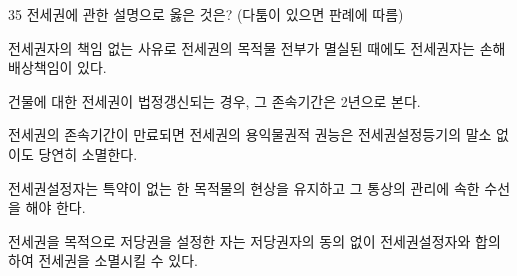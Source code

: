 \begin{question}{35}
전세권에 관한 설명으로 옳은 것은? (다툼이 있으면 판례에 따름)
\begin{choices}
  \item 전세권자의 책임 없는 사유로 전세권의 목적물 전부가 멸실된 때에도 전세권자는 손해배상책임이 있다.
  \item 건물에 대한 전세권이 법정갱신되는 경우, 그 존속기간은 2년으로 본다.
  \item 전세권의 존속기간이 만료되면 전세권의 용익물권적 권능은 전세권설정등기의 말소 없이도 당연히 소멸한다.
  \item 전세권설정자는 특약이 없는 한 목적물의 현상을 유지하고 그 통상의 관리에 속한 수선을 해야 한다.
  \item 전세권을 목적으로 저당권을 설정한 자는 저당권자의 동의 없이 전세권설정자와 합의하여 전세권을 소멸시킬 수 있다.
\end{choices}
\end{question}
